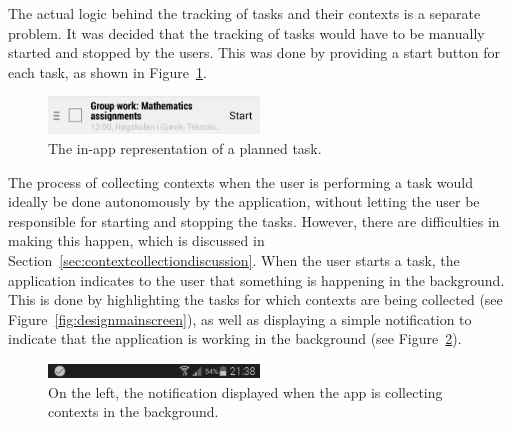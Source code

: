 The actual logic behind the tracking of tasks and their contexts is a separate problem. It was decided that the tracking of tasks would have to be manually started and stopped by the users. This was done by providing a start button for each task, as shown in Figure~\ref{fig:taskrepresentation}.
\begin{figure}[tbp]
  \centering
  \includegraphics[width=0.5\textwidth]{figures/TaskRepresentation.png}
  \caption[In-app representation of task]{The in-app representation of a planned task.}
  \label{fig:taskrepresentation}
\end{figure}
The process of collecting contexts when the user is performing a task would ideally be done autonomously by the application, without letting the user be responsible for starting and stopping the tasks. However, there are difficulties in making this happen, which is discussed in Section~\ref{sec:contextcollectiondiscussion}. When the user starts a task, the application indicates to the user that something is happening in the background. This is done by highlighting the tasks for which contexts are being collected (see Figure~\ref{fig:designmainscreen}), as well as displaying a simple notification to indicate that the application is working in the background (see Figure~\ref{fig:notification}).
\begin{figure}[tbp]
  \centering
  \includegraphics[width=0.5\textwidth]{figures/Notification.png}
  \caption[Context collection notification]{On the left, the notification displayed when the app is collecting contexts in the background.}
  \label{fig:notification}
\end{figure}



